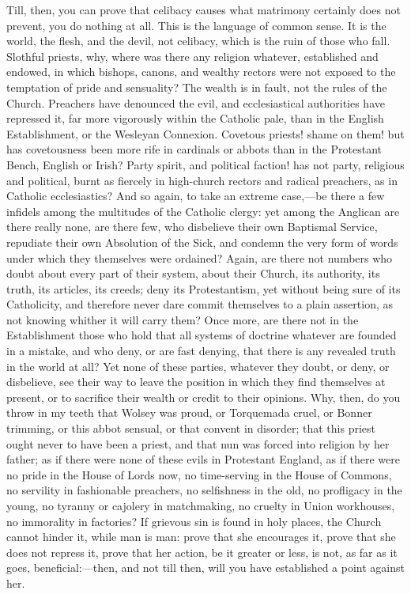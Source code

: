 Till, then, you can prove that celibacy causes what
matrimony certainly does not prevent, you do nothing at
all. This is the language of common sense. It is the
world, the flesh, and the devil, not celibacy, which is
the ruin of those who fall. Slothful priests, why, where
was there any religion whatever, established and endowed,
in which bishops, canons, and wealthy rectors were not
exposed to the temptation of pride and sensuality? The
wealth is in fault, not the rules of the Church.
Preachers have denounced the evil, and ecclesiastical
authorities have repressed it, far more vigorously within
the Catholic pale, than in the English Establishment, or
the Wesleyan Connexion. Covetous priests! shame on them!
but has covetousness been more rife in cardinals or
abbots than in the Protestant Bench, English or Irish?
Party spirit, and political faction! has not party,
religious and political, burnt as fiercely in high-church
rectors and radical preachers, as in Catholic
ecclesiastics? And so again, to take an extreme
case,—be there a few infidels among the multitudes
of the Catholic clergy: yet among the Anglican are there
really none, are there few, who disbelieve their own
Baptismal Service, repudiate their own Absolution of the
Sick, and condemn the very form of words under which they
themselves were ordained? Again, are there not numbers
who doubt about every part of their system, about their
Church, its authority, its truth, its articles, its
creeds; deny its Protestantism, yet without being sure of
its Catholicity, and therefore never dare commit
themselves to a plain assertion, as not knowing whither
it will carry them? Once more, are there not in the
Establishment those who hold that all systems of doctrine
whatever are founded in a mistake, and who deny, or are
fast denying, that there is any revealed truth in the
world at all? Yet none of these parties, whatever they
doubt, or deny, or disbelieve, see their way to leave the
position in which they find themselves at present, or to
sacrifice their wealth or credit to their opinions. Why,
then, do you throw in my teeth that Wolsey was proud, or
Torquemada cruel, or Bonner trimming, or this abbot
sensual, or that convent in disorder; that this priest
ought never to have been a priest, and that nun was
forced into religion by her father; as if there were none
of these evils in Protestant England, as if there were no
pride in the House of Lords now, no time-serving in the
House of Commons, no servility in fashionable preachers,
no selfishness in the old, no profligacy in the young, no
tyranny or cajolery in matchmaking, no cruelty in Union
workhouses, no immorality in factories? If grievous sin
is found in holy places, the Church cannot hinder it,
while man is man: prove that she encourages it, prove
that she does not repress it, prove that her action, be
it greater or less, is not, as far as it goes,
beneficial:—then, and not till then, will you have
established a point against her.

